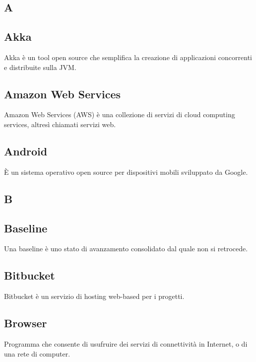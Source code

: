 \newpage

\begin{center}
\Huge\section*{\uppercase{A}}
\end{center}

\subsection*{Akka}
Akka è un tool open source che semplifica la creazione di applicazioni concorrenti e distribuite sulla JVM.

\subsection*{Amazon Web Services}
Amazon Web Services (AWS) è una collezione di servizi di cloud computing services, altresì chiamati servizi web.

\subsection*{Android}
È un sistema operativo open source per dispositivi mobili sviluppato da Google.

\newpage

\begin{center}
\Huge\section*{\uppercase{B}}
\end{center}

\subsection*{Baseline}
Una baseline è uno stato di avanzamento consolidato dal quale non si retrocede. 

\subsection*{Bitbucket}
Bitbucket è un servizio di hosting web-based per i progetti.

\subsection*{Browser}
Programma che consente di usufruire dei servizi di connettività in Internet, o di una rete di computer.

